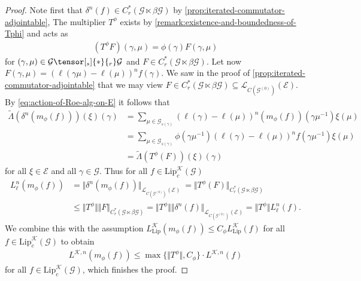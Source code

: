 \documentclass[11pt,a4paper,oneside,final,reqno]{amsart}
\theoremstyle{definition}
\newcommand{\G}{\mathcal{G}}
\newcommand{\Go}{\mathcal{G}^{(0)}}
\newcommand{\E}{\mathcal{E}}
\newcommand{\cK}{\mathcal{K}}
\newcommand{\curlyL}{\mathcal{L}}
\newcommand{\Lip}{\mathrm{Lip}}
\newcommand{\Cred}{C_{r}^{*}}
\numberwithin{equation}{section}
\begin{document}
	\begin{proof}
		Note first that 
		$\delta^n(f) \in \Cred ( \G \ltimes \beta\G)$
		by \cref{prop:iterated-commutator-adjointable}, The multiplier $T^\phi$ exists by \cref{remark:existence-and-boundedness-of-Tphi} and acts as
		\begin{align*}
			(T^\phi F)(\gamma, \mu) = \phi(\gamma) F(\gamma, \mu)
		\end{align*}
		for $(\gamma, \mu) \in \G \tensor[_s]{*}{_r} \G$ and  $F \in \Cred( \G \ltimes \beta \G)$. 
		Let now 
		$F(\gamma, \mu) = (\ell(\gamma \mu) - \ell(\mu))^n f(\gamma)$. 
		We saw in the proof of \cref{prop:iterated-commutator-adjointable} that we may view  
		$F \in \Cred( \G \ltimes \beta \G) \subseteq \curlyL_{C(\Go)}(\E)$. 
		By \eqref{eq:action-of-Roe-alg-on-E} it follows that
		\begin{align*}
			\tilde{\Lambda}(\delta^n (m_\phi (f)))(\xi) (\gamma) &= \sum_{\mu \in \G_{s(\gamma)}} (\ell(\gamma) - \ell(\mu))^n (m_\phi (f))(\gamma \mu^{-1}) \xi(\mu) \\
			&= \sum_{\mu \in \G_{s(\gamma)}} \phi(\gamma \mu^{-1}) (\ell(\gamma) - \ell(\mu))^n  f(\gamma \mu^{-1}) \xi(\mu) \\
			&= \tilde{\Lambda}(T^\phi(F)) (\xi)(\gamma)
		\end{align*}
		for all $\xi \in \E$ and all $\gamma \in \G$.
		Thus for all 
		$f \in \Lip_c^{\cK}(\G)$
		\begin{align*}
			L_\ell^n(m_\phi (f)) &= \Vert \delta^n (m_\phi (f))\Vert_{\curlyL_{C(\Go)}(\E)} \
			= \Vert T^\phi(F) \Vert_{\Cred(\G \ltimes \beta \G)} \\ 
			&\leq \Vert T^\phi \Vert \Vert F \Vert_{\Cred(\G \ltimes \beta \G)} 
			= \Vert T^\phi \Vert \Vert \delta^n(f) \Vert_{\curlyL_{C(\Go)}(\E)} = \Vert T^\phi \Vert L_\ell^n (f).
		\end{align*}
		We combine this with the assumption $L_{\mathrm{Lip}}^{\cK} (m_\phi (f)) \leq C_\phi L_{\mathrm{Lip}}^{\cK} ( f)$ for all 
		$f \in \Lip_c^{\cK}(\G)$
		to obtain 
		\begin{align*}
			L^{\cK,n} (m_\phi (f)) \leq \max \{ \Vert T^\phi \Vert , C_\phi  \} \cdot L^{\cK,n}(f)
		\end{align*}
		for all 
		$f \in \Lip_c^{\cK}(\G)$, 
		which finishes the proof. 
	\end{proof}
\end{document}
